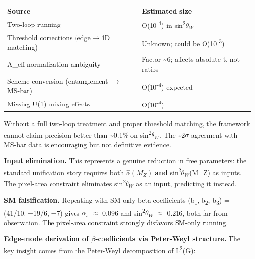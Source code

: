 \documentclass[11pt,a4paper]{article}
\theoremstyle{remark}
\begin{document}
{\def\LTcaptype{none} %
\begin{longtable}[]{@{}
  >{\raggedright\arraybackslash}p{}
  >{\raggedright\arraybackslash}p{}@{}}
\toprule\noalign{}
\begin{minipage}[b]{\linewidth}\raggedright
Source
\end{minipage} & \begin{minipage}[b]{\linewidth}\raggedright
Estimated size
\end{minipage} \\
\midrule\noalign{}
\endhead
\bottomrule\noalign{}
\endlastfoot
Two-loop running & O(10\textsuperscript{-4}) in sin\textsuperscript{2}$\theta_W$ \\
Threshold corrections (edge\ensuremath{\to}4D matching) & Unknown; could be O(10\textsuperscript{-3}) \\
A\_eff normalization ambiguity & Factor \textasciitilde6; affects absolute t, not ratios \\
Scheme conversion (entanglement \ensuremath{\to} MS-bar) & O(10\textsuperscript{-4}) expected \\
Missing U(1) mixing effects & O(10\textsuperscript{-4}) \\
\end{longtable}
}

Without a full two-loop treatment and proper threshold matching, the
framework cannot claim precision better than \textasciitilde0.1\% on sin\textsuperscript{2}$\theta_W$. The \textasciitilde2\ensuremath{\sigma}
agreement with MS-bar data is encouraging but not definitive evidence.

\textbf{Input elimination.} This represents a genuine reduction in free parameters:
the standard unification story requires both \(\hat{\alpha}(M_Z)\) \textbf{and}
sin\textsuperscript{2}$\theta_W$(M\_Z) as inputs. The pixel-area constraint eliminates sin\textsuperscript{2}$\theta_W$ as an
input, predicting it instead.

\textbf{SM falsification.} Repeating with SM-only beta coefficients
(b\textsubscript{1}, b\textsubscript{2}, b\textsubscript{3}) = (41/10, \ensuremath{-}19/6, \ensuremath{-}7) gives $\alpha_s$ \ensuremath{\approx} 0.096 and sin\textsuperscript{2}$\theta_W$ \ensuremath{\approx} 0.216,
both far from observation. The pixel-area constraint strongly disfavors
SM-only running.

\textbf{Edge-mode derivation of \ensuremath{\beta}-coefficients via Peter-Weyl structure.} The key insight comes from the Peter-Weyl decomposition of L\textsuperscript{2}(G):
\end{document}
